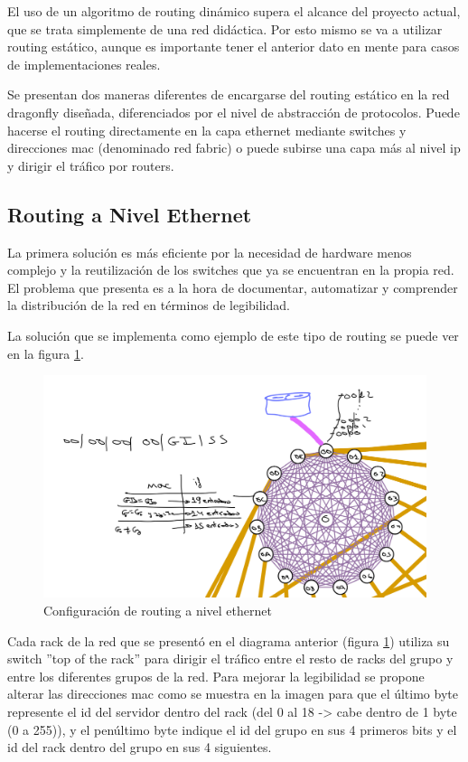 \documentclass[%
    school=etsisi,%
    degree=61TI,%
]{upm-report}
\begin{document}
El uso de un algoritmo de routing dinámico supera el alcance del proyecto actual, que se trata simplemente de una red didáctica. Por esto mismo se va a utilizar routing estático, aunque es importante tener el anterior dato en mente para casos de implementaciones reales.

Se presentan dos maneras diferentes de encargarse del routing estático en la red dragonfly diseñada, diferenciados por el nivel de abstracción de protocolos. Puede hacerse el routing directamente en la capa ethernet mediante switches y direcciones mac (denominado red fabric) o puede subirse una capa más al nivel ip y dirigir el tráfico por routers.

\subsection{Routing a Nivel Ethernet}
\label{subsec:routing-nivel-ethernet}

La primera solución es más eficiente por la necesidad de hardware menos complejo y la reutilización de los switches que ya se encuentran en la propia red. El problema que presenta es a la hora de documentar, automatizar y comprender la distribución de la red en términos de legibilidad.

La solución que se implementa como ejemplo de este tipo de routing se puede ver en la figura \ref{fig:ethernet-routing}.

\begin{figure}
    \centering
    \includegraphics[width=1.0\textwidth]{figures/routing-ethernet.png}
    \caption{\label{fig:ethernet-routing} Configuración de routing a nivel ethernet}
\end{figure}

Cada rack de la red que se presentó en el diagrama anterior (figura \ref{fig:ethernet-routing}) utiliza su switch ''top of the rack'' para dirigir el tráfico entre el resto de racks del grupo y entre los diferentes grupos de la red. Para mejorar la legibilidad se propone alterar las direcciones mac como se muestra en la imagen para que el último byte represente el id del servidor dentro del rack (del 0 al 18 -> cabe dentro de 1 byte (0 a 255)), y el penúltimo byte indique el id del grupo en sus 4 primeros bits y el id del rack dentro del grupo en sus 4 siguientes.
\end{document}
